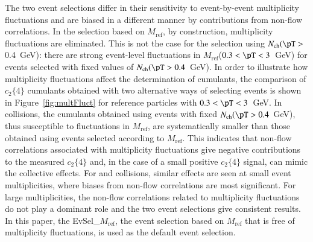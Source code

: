 \documentclass[cernpreprint,texlive=2014,txfonts,UKenglish]{latex/atlasdoc}
\begin{document}
The two event selections differ in their sensitivity to event-by-event multiplicity fluctuations and are biased in a different manner by contributions from non-flow correlations. In the selection based on $M_{\mathrm{ref}}$, by construction, multiplicity fluctuations are eliminated. This is not the case for the selection using $N_{\mathrm{ch}} (\pT >$ 0.4~GeV): there are strong event-level fluctuations in $M_{\mathrm{ref}}$($ 0.3 < \pT <3$~GeV)  for events selected with fixed values of $N_{\mathrm{ch}}(\pT > 0.4$~GeV). In order to illustrate how multiplicity fluctuations affect the determination of cumulants, the comparison of $c_2\{4\}$ cumulants obtained with two alternative ways of selecting events is shown in Figure~\ref{fig:multFluct} for reference particles with $ 0.3 < \pT <3$~GeV.  In \pp collisions, the cumulants obtained using events with fixed $N_{\mathrm{ch}}(\pT > 0.4$~GeV), thus susceptible to  fluctuations in $M_{\mathrm{ref}}$, are systematically smaller than those obtained using events selected according to $M_{\mathrm{ref}}$. This indicates that non-flow correlations associated with multiplicity fluctuations give negative contributions to the measured $c_2\{4\}$ and, in the case of a small positive $c_2\{4\}$ signal, can mimic the collective effects.  
For \pPb and \PbPb collisions, similar effects are seen at small event multiplicities, where biases from non-flow correlations are most significant. For large multiplicities, the non-flow correlations related to multiplicity fluctuations do not play a dominant role and the two event selections give consistent results. In this paper, the EvSel\_$M_{\mathrm{ref}}$, the event selection based on $M_{\mathrm{ref}}$ that is free of multiplicity fluctuations, is used as the default event selection. 
\end{document}
